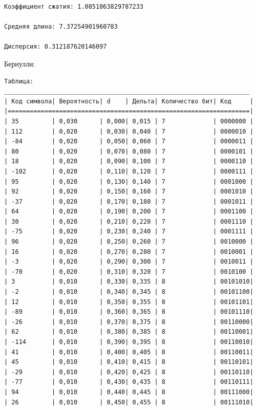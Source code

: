 \documentclass[a4paper,14pt]{extarticle}
\begin{document}
\begin{enumerate}
\begin{verbatim}
Коэффициент сжатия: 1.0851063829787233

Средняя длина: 7.37254901960783

Дисперсия: 0.312187620146097
\end{verbatim}

Бернулли:\\
\begin{verbatim}
Таблица: 
___________________________________________________________________
| Код символа| Вероятность| d    | Дельта| Количество бит| Код     |
|==================================================================|
| 35         | 0,030      | 0,000| 0,015 | 7             | 0000000 |
| 112        | 0,020      | 0,030| 0,040 | 7             | 0000010 |
| -84        | 0,020      | 0,050| 0,060 | 7             | 0000011 |
| 80         | 0,020      | 0,070| 0,080 | 7             | 0000101 |
| 18         | 0,020      | 0,090| 0,100 | 7             | 0000110 |
| -102       | 0,020      | 0,110| 0,120 | 7             | 0000111 |
| 95         | 0,020      | 0,130| 0,140 | 7             | 0001000 |
| 92         | 0,020      | 0,150| 0,160 | 7             | 0001010 |
| -37        | 0,020      | 0,170| 0,180 | 7             | 0001011 |
| 64         | 0,020      | 0,190| 0,200 | 7             | 0001100 |
| 30         | 0,020      | 0,210| 0,220 | 7             | 0001110 |
| -75        | 0,020      | 0,230| 0,240 | 7             | 0001111 |
| 96         | 0,020      | 0,250| 0,260 | 7             | 0010000 |
| 16         | 0,020      | 0,270| 0,280 | 7             | 0010001 |
| -3         | 0,020      | 0,290| 0,300 | 7             | 0010011 |
| -70        | 0,020      | 0,310| 0,320 | 7             | 0010100 |
| 3          | 0,010      | 0,330| 0,335 | 8             | 00101010|
| -2         | 0,010      | 0,340| 0,345 | 8             | 00101100|
| 12         | 0,010      | 0,350| 0,355 | 8             | 00101101|
| -89        | 0,010      | 0,360| 0,365 | 8             | 00101110|
| -26        | 0,010      | 0,370| 0,375 | 8             | 00110000|
| 62         | 0,010      | 0,380| 0,385 | 8             | 00110001|
| -114       | 0,010      | 0,390| 0,395 | 8             | 00110010|
| 41         | 0,010      | 0,400| 0,405 | 8             | 00110011|
| 45         | 0,010      | 0,410| 0,415 | 8             | 00110101|
| -29        | 0,010      | 0,420| 0,425 | 8             | 00110110|
| -77        | 0,010      | 0,430| 0,435 | 8             | 00110111|
| 94         | 0,010      | 0,440| 0,445 | 8             | 00111000|
| 26         | 0,010      | 0,450| 0,455 | 8             | 00111010|

\end{verbatim}
\end{enumerate}
\end{document}
